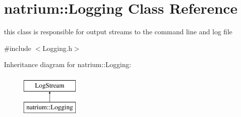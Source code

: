 \hypertarget{classnatrium_1_1Logging}{\section{natrium\-:\-:Logging Class Reference}
\label{classnatrium_1_1Logging}
}


this class is responsible for output streams to the command line and log file  




{\ttfamily \#include $<$Logging.\-h$>$}

Inheritance diagram for natrium\-:\-:Logging\-:\begin{figure}[H]
\begin{center}
\leavevmode
\includegraphics[height=2.000000cm]{classnatrium_1_1Logging}
\end{center}
\end{figure}
